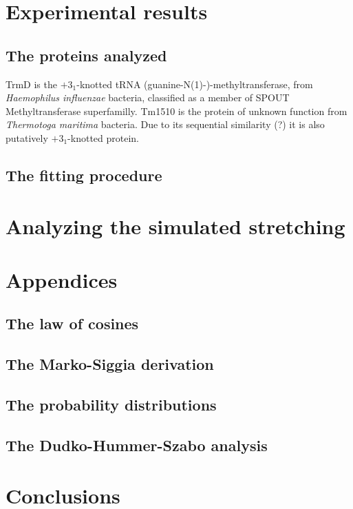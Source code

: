 \documentclass[11pt]{article}
\begin{document}
\section*{Experimental results}
\label{sec:exp}

\subsection*{The proteins analyzed}
\label{subsec:exp_proteins}
TrmD is the $+3_1$-knotted tRNA (guanine-N(1)-)-methyltransferase, from \textit{Haemophilus influenzae} bacteria, classified as a member of SPOUT Methyltransferase superfamilly.
Tm1510 is the protein of unknown function from \textit{Thermotoga maritima} bacteria.
Due to its sequential similarity (?) it is also putatively $+3_1$-knotted protein.

\subsection*{The fitting procedure}

\section{Analyzing the simulated stretching}
\label{sec:theory}


\section*{Appendices}
\label{sec:app}
\subsection*{The law of cosines}
\label{subsec:app_cosines}
\subsection*{The Marko-Siggia derivation}
\label{subsec:app_marko_siggia}
\subsection*{The probability distributions}
\label{subsec:app_probability}
\subsection*{The Dudko-Hummer-Szabo analysis}
\label{subsec:app_dudko}

\section{Conclusions}
\label{sec:conclusions}



\end{document}
